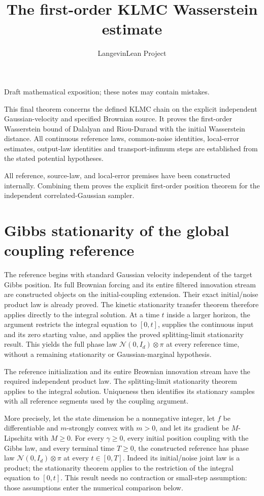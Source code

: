 \documentclass[11pt,a4paper]{article}
\title{\texorpdfstring{The first-order KLMC Wasserstein estimate}{The first-order KLMC Wasserstein estimate}}
\author{LangevinLean Project}
\date{}
\begin{document}
\maketitle
Draft mathematical exposition; these notes may contain mistakes.


This final theorem concerns the defined KLMC chain on the explicit independent Gaussian-velocity and specified Brownian source. It proves the first-order Wasserstein bound of Dalalyan and Riou-Durand with the initial Wasserstein distance. All continuous reference laws, common-noise identities, local-error estimates, output-law identities and transport-infimum steps are established from the stated potential hypotheses.



All reference, source-law, and local-error premises have been constructed internally. Combining them proves the explicit first-order position theorem for the independent correlated-Gaussian sampler.


\section{\texorpdfstring{Gibbs stationarity of the global coupling reference}{Gibbs stationarity of the global coupling reference}}


The reference begins with standard Gaussian velocity independent of the target Gibbs position. Its full Brownian forcing and its entire filtered innovation stream are constructed objects on the initial-coupling extension. Their exact initial/\allowbreak{}noise product law is already proved. The kinetic stationarity transfer theorem therefore applies directly to the integral solution. At a time \(t\) inside a larger horizon, the argument restricts the integral equation to \([0,t]\), supplies the continuous input and its zero starting value, and applies the proved splitting-limit stationarity result. This yields the full phase law \(\mathcal N(0,I_d)\otimes\pi\) at every reference time, without a remaining stationarity or Gaussian-marginal hypothesis.



The reference initialization and its entire Brownian innovation stream have the required independent product law. The splitting-limit stationarity theorem applies to the integral solution. Uniqueness then identifies its stationary samples with all reference segments used by the coupling argument.




More precisely, let the state dimension be a nonnegative integer, let \(f\) be differentiable and \(m\)-strongly convex with \(m>0\), and let its gradient be \(M\)-Lipschitz with \(M\ge0\). For every \(\gamma\ge0\), every initial position coupling with the Gibbs law, and every terminal time \(T\ge0\), the constructed reference has phase law \(\mathcal N(0,I_d)\otimes\pi\) at every \(t\in[0,T]\). Indeed its initial/\allowbreak{}noise joint law is a product; the stationarity theorem applies to the restriction of the integral equation to \([0,t]\). This result needs no contraction or small-step assumption: those assumptions enter the numerical comparison below.
\end{document}

